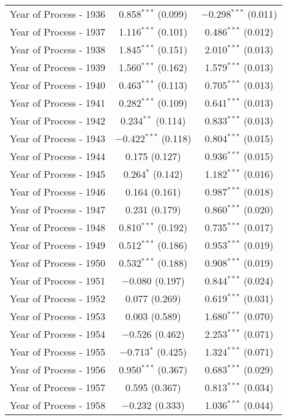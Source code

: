 \begin{table}[!h]
\begin{tabular}{@{\extracolsep{5pt}}lcc}
  Year of Process - 1936 & 0.858$^{***}$ (0.099) & $-$0.298$^{***}$ (0.011) \\ 
  Year of Process - 1937 & 1.116$^{***}$ (0.101) & 0.486$^{***}$ (0.012) \\ 
  Year of Process - 1938 & 1.845$^{***}$ (0.151) & 2.010$^{***}$ (0.013) \\ 
  Year of Process - 1939 & 1.560$^{***}$ (0.162) & 1.579$^{***}$ (0.013) \\ 
  Year of Process - 1940 & 0.463$^{***}$ (0.113) & 0.705$^{***}$ (0.013) \\ 
  Year of Process - 1941 & 0.282$^{***}$ (0.109) & 0.641$^{***}$ (0.013) \\ 
  Year of Process - 1942 & 0.234$^{**}$ (0.114) & 0.833$^{***}$ (0.013) \\ 
  Year of Process - 1943 & $-$0.422$^{***}$ (0.118) & 0.804$^{***}$ (0.015) \\ 
  Year of Process - 1944 & 0.175 (0.127) & 0.936$^{***}$ (0.015) \\ 
  Year of Process - 1945 & 0.264$^{*}$ (0.142) & 1.182$^{***}$ (0.016) \\ 
  Year of Process - 1946 & 0.164 (0.161) & 0.987$^{***}$ (0.018) \\ 
  Year of Process - 1947 & 0.231 (0.179) & 0.860$^{***}$ (0.020) \\ 
  Year of Process - 1948 & 0.810$^{***}$ (0.192) & 0.735$^{***}$ (0.017) \\ 
  Year of Process - 1949 & 0.512$^{***}$ (0.186) & 0.953$^{***}$ (0.019) \\ 
  Year of Process - 1950 & 0.532$^{***}$ (0.188) & 0.908$^{***}$ (0.019) \\ 
  Year of Process - 1951 & $-$0.080 (0.197) & 0.844$^{***}$ (0.024) \\ 
  Year of Process - 1952 & 0.077 (0.269) & 0.619$^{***}$ (0.031) \\ 
  Year of Process - 1953 & 0.003 (0.589) & 1.680$^{***}$ (0.070) \\ 
  Year of Process - 1954 & $-$0.526 (0.462) & 2.253$^{***}$ (0.071) \\ 
  Year of Process - 1955 & $-$0.713$^{*}$ (0.425) & 1.324$^{***}$ (0.071) \\ 
  Year of Process - 1956 & 0.950$^{***}$ (0.367) & 0.683$^{***}$ (0.029) \\ 
  Year of Process - 1957 & 0.595 (0.367) & 0.813$^{***}$ (0.034) \\ 
  Year of Process - 1958 & $-$0.232 (0.333) & 1.036$^{***}$ (0.044) \\ 

\end{tabular}
\end{table}
